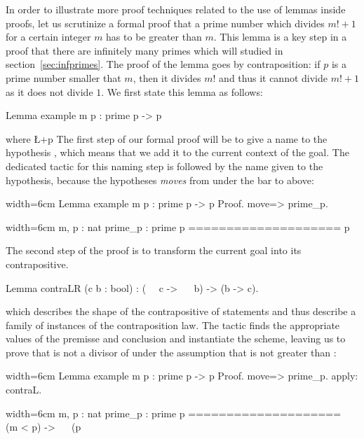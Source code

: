 In order to illustrate more proof techniques related to the use of
lemmas inside proofs, let us scrutinize a formal proof that a prime
number which divides $m! + 1$ for a certain integer $m$ has to be
greater than $m$. This lemma is a key step in a proof that there are
infinitely many primes which will studied in
section~\ref{sec:infprimes}. The proof of the lemma goes by
contraposition: if $p$ is a prime number smaller that $m$, then it
divides $m!$ and thus it cannot divide $m! + 1$ as it does not divide
$1$. We first state this lemma as follows:

\begin{coq}{}{}
Lemma example m p : prime p -> p %
\end{coq}
where \L+p %
The first step of our formal proof will be to give a name to the
hypothesis , which means that we add it to the
current context of the goal. The dedicated tactic for this naming step is
 followed by the name given to the hypothesis, because the
hypotheses \emph{moves} from under the bar to above:

\begin{coq}{}{width=6cm}
Lemma example m p : prime p ->
  p %
Proof.
move=> prime_p.
\end{coq}
\begin{coqout}{}{width=6cm}
m, p : nat
prime_p : prime p
====================
p %
\end{coqout}
The second step of the proof is to transform the current goal into its
contrapositive.

\begin{coq}{}{}
Lemma contraLR (c b : bool) :  (~~ c -> ~~ b) -> (b -> c).
\end{coq}

which describes the shape of the contrapositive of statements and thus
describe a family of
instances of the contraposition law. The  tactic
finds the appropriate values of the premisse and conclusion and
instantiate the scheme, leaving us to prove that  is not a
divisor of  under the assumption that  is not
greater than :

\begin{coq}{}{width=6cm}
Lemma example m p : prime p ->
  p %
Proof.
move=> prime_p.
apply: contraL.
\end{coq}
\begin{coqout}{}{width=6cm}
m, p : nat
prime_p : prime p
====================
 ~~ (m < p) -> ~~ (p %
\end{coqout}

